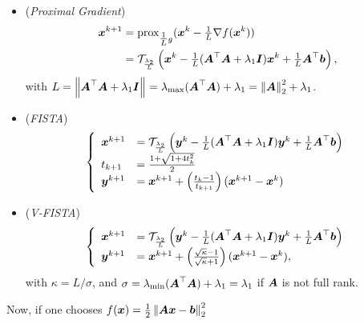 \begin{itemize}
    \item (\emph{Proximal Gradient})
    \begin{align*}
    \begin{split}
        \boldsymbol x^{k+1} &= \operatorname{prox}_{{\textstyle\frac{1}{L}} g}(\boldsymbol x^k - {\textstyle\frac{1}{L}} 
        \nabla f(\boldsymbol x^k)) \\
        &= \mathcal T_{\frac{\lambda_2}{L}} \left( \boldsymbol x^k 
        - {\textstyle\frac{1}{L}} (\boldsymbol A^\top \boldsymbol A + \lambda_1 \boldsymbol I) 
        \boldsymbol x^k + {\textstyle\frac{1}{L}} \boldsymbol A^\top\boldsymbol b
        \right),
    \end{split}
    \end{align*}
    with $L = \left\lVert\boldsymbol A^\top \boldsymbol A + \lambda_1 \boldsymbol I\right\rVert_{}
    = \lambda_{\max} (\boldsymbol A^\top \boldsymbol A) + \lambda_1 = \left\lVert\boldsymbol A\right\rVert_{2}^2
    + \lambda_1$.
    \item (\emph{FISTA})
    \begin{align*}
    \begin{split}
    \left\{
    \begin{array}{lll}
        \boldsymbol x^{k+1} &= \mathcal T_{\frac{\lambda_2}{L}} 
        \left( \boldsymbol y^k - {\textstyle\frac{1}{L}} (\boldsymbol A^\top \boldsymbol A + \lambda_1 \boldsymbol I) 
        \boldsymbol y^k + {\textstyle\frac{1}{L}} \boldsymbol A^\top\boldsymbol b \right) \\
        t_{k+1} &= \frac{1+\sqrt{1+4t_k^2}}{2} \\
        \boldsymbol y^{k+1} &= \boldsymbol x^{k+1} + \left( 
        \frac{t_k-1}{t_{k+1}} \right) (\boldsymbol x^{k+1}- \boldsymbol x^k)
    \end{array}
    \right.
    \end{split}
    \end{align*}
    \item (\emph{V-FISTA})
    \begin{align*}
    \begin{split}
    \left\{
    \begin{array}{ll}
        \boldsymbol x^{k+1} &= \mathcal T_{\frac{\lambda_2}{L}} 
        \left( \boldsymbol y^k - {\textstyle\frac{1}{L}} (\boldsymbol A^\top \boldsymbol A + \lambda_1 \boldsymbol I) 
        \boldsymbol y^k + {\textstyle\frac{1}{L}} \boldsymbol A^\top\boldsymbol b \right) \\
        \boldsymbol y^{k+1} &= \boldsymbol x^{k+1} + \left( 
        \frac{\sqrt\kappa-1}{\sqrt\kappa+1} \right) 
        (\boldsymbol x^{k+1}- \boldsymbol x^k),
    \end{array}
    \right.
    \end{split}
    \end{align*}
    with $\kappa=L/\sigma$, and $\sigma=\lambda_{\min} (\boldsymbol A^\top \boldsymbol A)
    + \lambda_1 = \lambda_1$ if $\boldsymbol A$ is not full rank.
\end{itemize}
%
Now, if one chooses $f(\boldsymbol x) = {\textstyle\frac{1}{2}} \left\lVert\boldsymbol{Ax}-\boldsymbol b\right\rVert_{2}^2$ 
